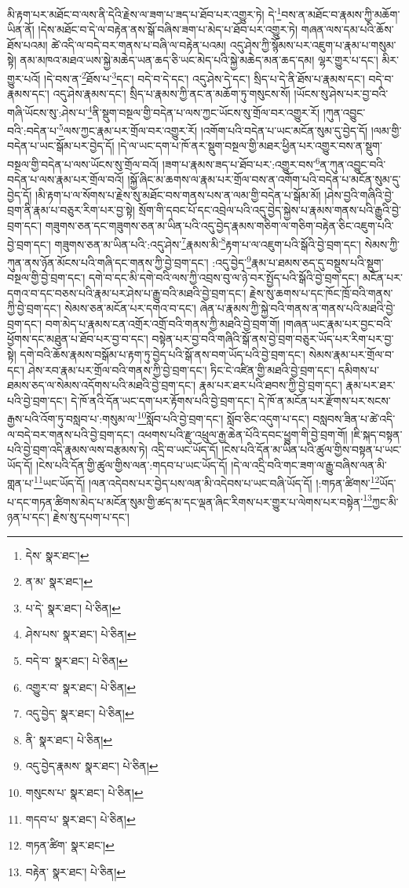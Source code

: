 མི་རྟག་པར་མཐོང་བ་ལས་ནི་དེའི་རྗེས་ལ་ཟག་པ་ཟད་པ་ཐོབ་པར་འགྱུར་ཏེ། དེ་\footnote{དེས་  སྣར་ཐང་། }བས་ན་མཐོང་བ་རྣམས་ཀྱི་མཆོག་ཡིན་ནོ། །དེས་མཐོང་བ་དེ་ལ་བརྟེན་ནས་སྒོ་བཞིས་ཟག་པ་མེད་པ་ཐོབ་པར་འགྱུར་ཏེ། གཞན་ལས་དམ་པའི་ཆོས་ཐོས་པའམ། ཚེ་འདི་ལ་བདེ་བར་གནས་པ་བཞི་ལ་བརྟེན་པའམ། འདུ་ཤེས་ཀྱི་སྙོམས་པར་འཇུག་པ་རྣམ་པ་གསུམ་སྟེ། ནམ་མཁའ་མཐའ་ཡས་སྐྱེ་མཆེད་ཡན་ཆད་ཅི་ཡང་མེད་པའི་སྐྱེ་མཆེད་མན་ཆད་དམ། ལྷར་གྱུར་པ་དང་། མིར་གྱུར་པའོ། །དེ་བས་ན་\footnote{ན་མ་  སྣར་ཐང་། }ཐོས་པ་\footnote{པ་དེ་  སྣར་ཐང་།  པེ་ཅིན། }དང་། བདེ་བ་དེ་དང་། འདུ་ཤེས་དེ་དང་། སྲིད་པ་དེ་ནི་ཐོས་པ་རྣམས་དང་། བདེ་བ་རྣམས་དང་། འདུ་ཤེས་རྣམས་དང་། སྲིད་པ་རྣམས་ཀྱི་ནང་ན་མཆོག་ཏུ་གསུངས་སོ། །ཡོངས་སུ་ཤེས་པར་བྱ་བའི་གཞི་ཡོངས་སུ་:ཤེས་པ་\footnote{ཤེས་པས་  སྣར་ཐང་།  པེ་ཅིན། }ནི་སྡུག་བསྔལ་གྱི་བདེན་པ་ལས་ཀྱང་ཡོངས་སུ་གྲོལ་བར་འགྱུར་རོ། །ཀུན་འབྱུང་བའི་:བདེན་པ་\footnote{བདེ་བ་  སྣར་ཐང་།  པེ་ཅིན། }ལས་ཀྱང་རྣམ་པར་གྲོལ་བར་འགྱུར་རོ། །འགོག་པའི་བདེན་པ་ཡང་མངོན་སུམ་དུ་བྱེད་དོ། །ལམ་གྱི་བདེན་པ་ཡང་སྒོམ་པར་བྱེད་དོ། །དེ་ལ་ཡང་དག་པ་ཁོ་ནར་སྡུག་བསྔལ་གྱི་མཐར་ཕྱིན་པར་འགྱུར་བས་ན་སྡུག་བསྔལ་གྱི་བདེན་པ་ལས་ཡོངས་སུ་གྲོལ་བའོ། །ཟག་པ་རྣམས་ཟད་པ་ཐོབ་པར་:འགྱུར་བས་\footnote{འགྱུར་བ་  སྣར་ཐང་།  པེ་ཅིན། }ན་ཀུན་འབྱུང་བའི་བདེན་པ་ལས་རྣམ་པར་གྲོལ་བའོ། །སྐྱོ་ཞིང་མ་ཆགས་ལ་རྣམ་པར་གྲོལ་བས་ན་འགོག་པའི་བདེན་པ་མངོན་སུམ་དུ་བྱེད་དོ། །མི་རྟག་པ་ལ་སོགས་པ་རྗེས་སུ་མཐོང་བས་གནས་པས་ན་ལམ་གྱི་བདེན་པ་སྒོམ་མོ། །ཤེས་བྱའི་གཞིའི་བྱེ་བྲག་ནི་རྣམ་པ་བཅུར་རིག་པར་བྱ་སྟེ། སྲོག་གི་དབང་པོ་དང་འབྲེལ་པའི་འདུ་བྱེད་སྐྱེས་པ་རྣམས་གནས་པའི་རྒྱུའི་བྱེ་བྲག་དང་། གཟུགས་ཅན་དང་གཟུགས་ཅན་མ་ཡིན་པའི་འདུ་བྱེད་རྣམས་གཅིག་ལ་གཅིག་བརྟེན་ཅིང་འཇུག་པའི་བྱེ་བྲག་དང་། གཟུགས་ཅན་མ་ཡིན་པའི་:འདུ་ཤེས་\footnote{འདུ་བྱེད་  སྣར་ཐང་།  པེ་ཅིན། }རྣམས་མི་\footnote{ནི་  སྣར་ཐང་།  པེ་ཅིན། }རྟག་པ་ལ་འཇུག་པའི་སྒོའི་བྱེ་བྲག་དང་། སེམས་ཀྱི་ཀུན་ནས་ཉོན་མོངས་པའི་གཞི་དང་གནས་ཀྱི་བྱེ་བྲག་དང་། :འདུ་བྱེད་\footnote{འདུ་བྱེད་རྣམས་  སྣར་ཐང་།  པེ་ཅིན། }རྣམ་པ་ཐམས་ཅད་དུ་བསྡུས་པའི་སྡུག་བསྔལ་གྱི་བྱེ་བྲག་དང་། དགེ་བ་དང་མི་དགེ་བའི་ལས་ཀྱི་འབྲས་བུ་ལ་ཉེ་བར་སྤྱོད་པའི་སྒོའི་བྱེ་བྲག་དང་། མངོན་པར་དགའ་བ་དང་བཅས་པའི་རྣམ་པར་ཤེས་པ་རྒྱུ་བའི་མཐའི་བྱེ་བྲག་དང་། རྗེས་སུ་ཆགས་པ་དང་ཁོང་ཁྲོ་བའི་གནས་ཀྱི་བྱེ་བྲག་དང་། སེམས་ཅན་མངོན་པར་དགའ་བ་དང་། ཞེན་པ་རྣམས་ཀྱི་སྐྱེ་བའི་གནས་ན་གནས་པའི་མཐའི་བྱེ་བྲག་དང་། བག་མེད་པ་རྣམས་ངན་འགྲོར་འགྲོ་བའི་གནས་ཀྱི་མཐའི་བྱེ་བྲག་གོ། །གཞན་ཡང་རྣམ་པར་བྱང་བའི་ཕྱོགས་དང་མཐུན་པ་ཐོབ་པར་བྱ་བ་དང་། བསྟེན་པར་བྱ་བའི་གཞིའི་སྒོ་ནས་བྱེ་བྲག་བཅུར་ཡོད་པར་རིག་པར་བྱ་སྟེ། དགེ་བའི་ཆོས་རྣམས་བསྒོམ་པ་རྟག་ཏུ་བྱེད་པའི་སྒོ་ནས་བག་ཡོད་པའི་བྱེ་བྲག་དང་། སེམས་རྣམ་པར་གྲོལ་བ་དང་། ཤེས་རབ་རྣམ་པར་གྲོལ་བའི་གནས་ཀྱི་བྱེ་བྲག་དང་། ཏིང་ངེ་འཛིན་གྱི་མཐའི་བྱེ་བྲག་དང་། དམིགས་པ་ཐམས་ཅད་ལ་སེམས་འདོགས་པའི་མཐའི་བྱེ་བྲག་དང་། རྣམ་པར་ཐར་པའི་ཐབས་ཀྱི་བྱེ་བྲག་དང་། རྣམ་པར་ཐར་པའི་བྱེ་བྲག་དང་། དེ་ཁོ་ནའི་དོན་ཡང་དག་པར་རྟོགས་པའི་བྱེ་བྲག་དང་། དེ་ཁོ་ན་མངོན་པར་རྫོགས་པར་སངས་རྒྱས་པའི་འོག་ཏུ་བསླབ་པ་:གསུམ་ལ་\footnote{གསུངས་པ་  སྣར་ཐང་།  པེ་ཅིན། }སློབ་པའི་བྱེ་བྲག་དང་། སློབ་ཅིང་འདུག་པ་དང་། བསླབས་ཟིན་པ་ཚེ་འདི་ལ་བདེ་བར་གནས་པའི་བྱེ་བྲག་དང་། འཕགས་པའི་རྫུ་འཕྲུལ་རྒྱ་ཆེན་པོའི་དབང་ཕྱུག་གི་བྱེ་བྲག་གོ། །ཇི་སྐད་བསྟན་པའི་བྱེ་བྲག་འདི་རྣམས་ལས་བརྩམས་ཏེ། འདྲི་བ་ཡང་ཡོད་དོ། །ངེས་པའི་དོན་མ་ཡིན་པའི་ཚུལ་གྱིས་བསྟན་པ་ཡང་ཡོད་དོ། །ངེས་པའི་དོན་གྱི་ཚུལ་གྱིས་ལན་:གདབ་པ་ཡང་ཡོད་དོ། །དེ་ལ་འདྲི་བའི་གང་ཟག་ལ་རྒྱུ་བཞིས་ལན་མི་གླན་པ་\footnote{གདབ་པ་  སྣར་ཐང་།  པེ་ཅིན། }ཡང་ཡོད་དོ། །ལན་འདེབས་པར་བྱེད་པས་ལན་མི་འདེབས་པ་ཡང་བཞི་ཡོད་དོ། །:གཏན་ཚིགས་\footnote{གཏན་ཚིག་  སྣར་ཐང་། }ཡོད་པ་དང་གཏན་ཚིགས་མེད་པ་མངོན་སུམ་གྱི་ཚད་མ་དང་ལྡན་ཞིང་རིགས་པར་གྱུར་པ་ལེགས་པར་བསྟེན་\footnote{བརྟེན་  སྣར་ཐང་།  པེ་ཅིན། }ཀྱང་མི་ཉན་པ་དང་། རྗེས་སུ་དཔག་པ་དང་། 